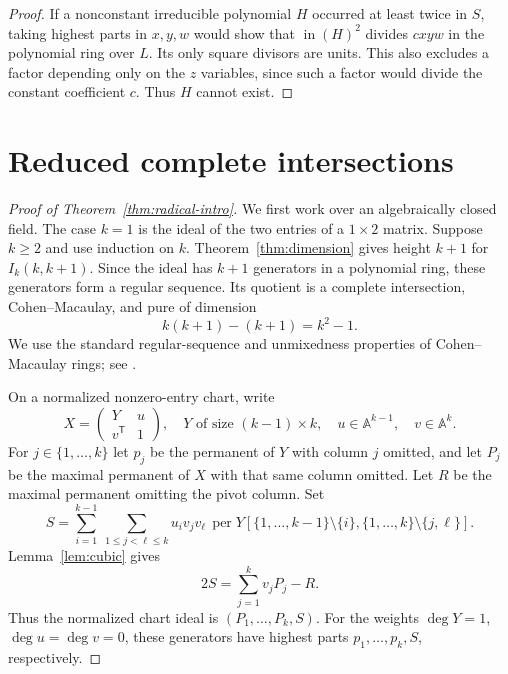\documentclass[11pt]{article}
\theoremstyle{remark}
\DeclareMathOperator{\per}{per}
\DeclareMathOperator{\htop}{in}
\newcommand{\A}{\mathbb A}
\numberwithin{equation}{section}
\begin{document}
\begin{proof}
If a nonconstant irreducible polynomial $H$ occurred at least twice
in $S$, taking highest parts in $x,y,w$ would show that
$\htop(H)^2$ divides $cxyw$ in the polynomial ring over $L$.
Its only square divisors are units. This also excludes a factor
depending only on the $z$ variables, since such a factor would
divide the constant coefficient $c$. Thus $H$ cannot exist.
\end{proof}

\section{Reduced complete intersections}\label{sec:radical}

\begin{proof}[Proof of Theorem~\ref{thm:radical-intro}]
We first work over an algebraically closed field. The case $k=1$
is the ideal of the two entries of a $1\times2$ matrix. Suppose
$k\geq2$ and use induction on $k$.
Theorem~\ref{thm:dimension} gives height $k+1$ for $I_k(k,k+1)$.
Since the ideal has $k+1$ generators in a polynomial ring, these
generators form a regular sequence. Its quotient is a complete
intersection, Cohen--Macaulay, and pure of dimension
\begin{equation}\label{eq:global-CI-dimension}
 k(k+1)-(k+1)=k^2-1.
\end{equation}
We use the standard regular-sequence and unmixedness properties of
Cohen--Macaulay rings; see \cite[Tag 00N7]{Stacks}.

On a normalized nonzero-entry chart, write
\[
 X=\begin{pmatrix}Y&u\\ v^{\mathsf T}&1\end{pmatrix},
 \quad Y\text{ of size }(k-1)\times k,
 \quad u\in\A^{k-1},\quad v\in\A^k.
\]
For $j\in\{1,\ldots,k\}$ let $p_j$ be the permanent of $Y$ with
column $j$ omitted, and let $P_j$ be the maximal permanent of $X$
with that same column omitted. Let $R$ be the maximal permanent
omitting the pivot column. Set
\begin{equation}\label{eq:S}
 S=\sum_{i=1}^{k-1}\ \sum_{1\leq j<\ell\leq k}
 u_i v_jv_\ell\,
 \per Y[\{1,\ldots,k-1\}\setminus\{i\},
        \{1,\ldots,k\}\setminus\{j,\ell\}].
\end{equation}
Lemma~\ref{lem:cubic} gives
\begin{equation}\label{eq:S-syzygy}
 2S=\sum_{j=1}^k v_jP_j-R.
\end{equation}
Thus the normalized chart ideal is $(P_1,\ldots,P_k,S)$.
For the weights $\deg Y=1$, $\deg u=\deg v=0$, these generators
have highest parts $p_1,\ldots,p_k,S$, respectively.


\end{proof}
\end{document}
